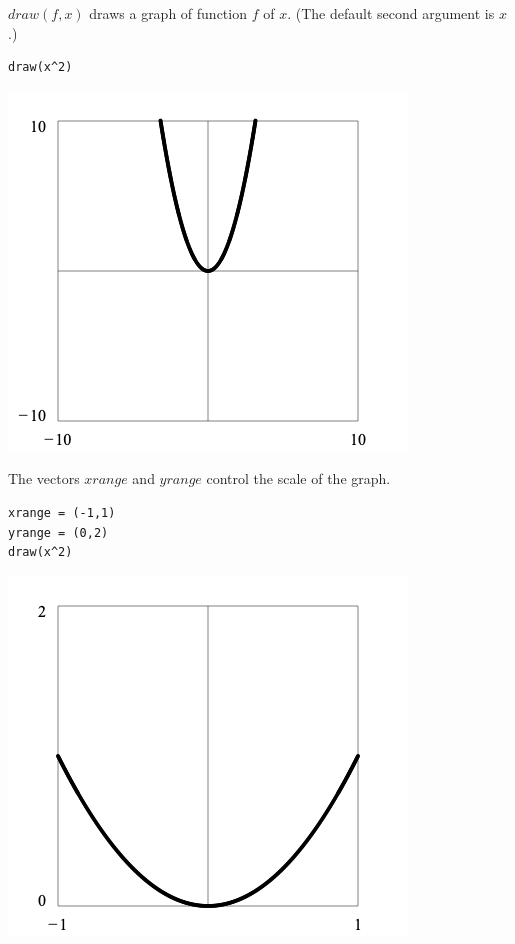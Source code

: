 $draw(f,x)$ draws a graph of function $f$ of $x$.
(The default second argument is $x$.)

{\color{blue}
\begin{verbatim}
draw(x^2)
\end{verbatim}
}

\begin{center}
\includegraphics[scale=0.5]{parabola1.png}
\end{center}

\noindent
The vectors $xrange$ and $yrange$ control the scale of the graph.

{\color{blue}
\begin{verbatim}
xrange = (-1,1)
yrange = (0,2)
draw(x^2)
\end{verbatim}
}

\begin{center}
\includegraphics[scale=0.5]{parabola2.png}
\end{center}

